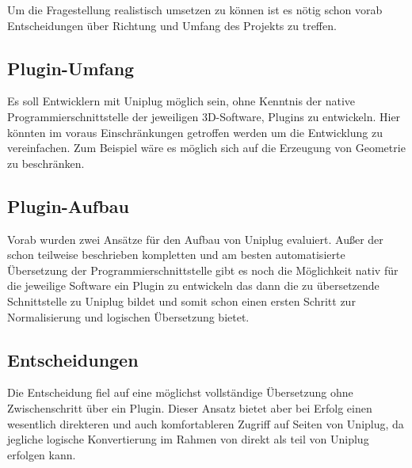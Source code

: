  \label{sec:Vorueberlegungen}

Um die Fragestellung realistisch umsetzen zu können ist es nötig schon vorab Entscheidungen über Richtung und Umfang des Projekts zu treffen.

\subsection{Plugin-Umfang}
Es soll Entwicklern mit Uniplug möglich sein, ohne Kenntnis der native Programmierschnittstelle der jeweiligen 3D-Software, Plugins zu entwickeln. Hier könnten im voraus Einschränkungen getroffen werden um die Entwicklung zu vereinfachen. Zum Beispiel wäre es möglich sich auf die Erzeugung von Geometrie zu beschränken.

\subsection{Plugin-Aufbau}
Vorab wurden zwei Ansätze für den Aufbau von Uniplug evaluiert. Außer der schon teilweise beschrieben kompletten und am besten automatisierte Übersetzung der Programmierschnittstelle gibt es noch die Möglichkeit nativ für die jeweilige Software ein Plugin zu entwickeln das dann die zu übersetzende Schnittstelle zu Uniplug bildet und somit schon einen ersten Schritt zur Normalisierung und logischen Übersetzung bietet.

\subsection{Entscheidungen}
Die Entscheidung fiel auf eine möglichst vollständige Übersetzung ohne Zwischenschritt über ein Plugin. Dieser Ansatz bietet aber bei Erfolg einen wesentlich direkteren und auch komfortableren Zugriff auf Seiten von Uniplug, da jegliche logische Konvertierung im Rahmen von \CS direkt als teil von Uniplug erfolgen kann.


